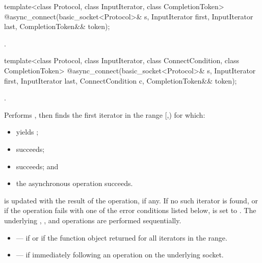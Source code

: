 \begin{itemdecl}
template<class Protocol, class InputIterator, class CompletionToken>
  @\DEDUCED@ async_connect(basic_socket<Protocol>& s,
                        InputIterator first, InputIterator last,
                        CompletionToken&& token);
\end{itemdecl}

\begin{itemdescr}
\pnum
\returns {}.
\end{itemdescr}

\begin{itemdecl}
template<class Protocol, class InputIterator,
  class ConnectCondition, class CompletionToken>
    @\DEDUCED@ async_connect(basic_socket<Protocol>& s,
                          InputIterator first, InputIterator last,
                          ConnectCondition c,
                          CompletionToken&& token);
\end{itemdecl}

\begin{itemdescr}
\pnum
\completionsig {}.

\pnum
\effects Performs , then finds the first iterator  in the range [,) for which:
\begin{itemize}
\item
{} yields ;
\item
{} succeeds;
\item
{} succeeds; and
\item
 the asynchronous operation  succeeds.
\end{itemize}
\pnum
{} is updated with the result of the  operation, if any. If no such iterator is found, or if the operation fails with one of the error conditions listed below,  is set to . \enternote The underlying , , and  operations are performed sequentially. \exitnote

\pnum
\errors
\begin{itemize}
\item
{} --- if  or if the function object  returned  for all iterators in the range.
\item
{} --- if  immediately following an  operation on the underlying socket.
\end{itemize}
\end{itemdescr}



